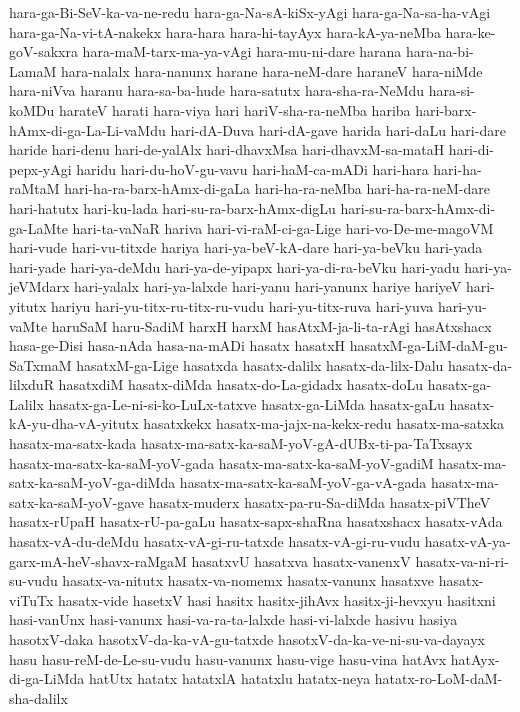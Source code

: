 {hara-ga-Bi-SeV-ka-va-ne-redu
hara-ga-Na-sA-kiSx-yAgi
hara-ga-Na-sa-ha-vAgi
hara-ga-Na-vi-tA-nakekx
hara-hara
hara-hi-tayAyx
hara-kA-ya-neMba
hara-ke-goV-sakxra
hara-maM-tarx-ma-ya-vAgi
hara-mu-ni-dare
harana
hara-na-bi-LamaM
hara-nalalx
hara-nanunx
harane
hara-neM-dare
haraneV
hara-niMde
hara-niVva
haranu
hara-sa-ba-hude
hara-satutx
hara-sha-ra-NeMdu
hara-si-koMDu
harateV
harati
hara-viya
hari
hariV-sha-ra-neMba
hariba
hari-barx-hAmx-di-ga-La-Li-vaMdu
hari-dA-Duva
hari-dA-gave
harida
hari-daLu
hari-dare
haride
hari-denu
hari-de-yalAlx
hari-dhavxMsa
hari-dhavxM-sa-mataH
hari-di-pepx-yAgi
haridu
hari-du-hoV-gu-vavu
hari-haM-ca-mADi
hari-hara
hari-ha-raMtaM
hari-ha-ra-barx-hAmx-di-gaLa
hari-ha-ra-neMba
hari-ha-ra-neM-dare
hari-hatutx
hari-ku-lada
hari-su-ra-barx-hAmx-digLu
hari-su-ra-barx-hAmx-di-ga-LaMte
hari-ta-vaNaR
hariva
hari-vi-raM-ci-ga-Lige
hari-vo-De-me-magoVM
hari-vude
hari-vu-titxde
hariya
hari-ya-beV-kA-dare
hari-ya-beVku
hari-yada
hari-yade
hari-ya-deMdu
hari-ya-de-yipapx
hari-ya-di-ra-beVku
hari-yadu
hari-ya-jeVMdarx
hari-yalalx
hari-ya-lalxde
hari-yanu
hari-yanunx
hariye
hariyeV
hari-yitutx
hariyu
hari-yu-titx-ru-titx-ru-vudu
hari-yu-titx-ruva
hari-yuva
hari-yu-vaMte
haruSaM
haru-SadiM
harxH
harxM
hasAtxM-ja-li-ta-rAgi
hasAtxshacx
hasa-ge-Disi
hasa-nAda
hasa-na-mADi
hasatx
hasatxH
hasatxM-ga-LiM-daM-gu-SaTxmaM
hasatxM-ga-Lige
hasatxda
hasatx-dalilx
hasatx-da-lilx-Dalu
hasatx-da-lilxduR
hasatxdiM
hasatx-diMda
hasatx-do-La-gidadx
hasatx-doLu
hasatx-ga-Lalilx
hasatx-ga-Le-ni-si-ko-LuLx-tatxve
hasatx-ga-LiMda
hasatx-gaLu
hasatx-kA-yu-dha-vA-yitutx
hasatxkekx
hasatx-ma-jajx-na-kekx-redu
hasatx-ma-satxka
hasatx-ma-satx-kada
hasatx-ma-satx-ka-saM-yoV-gA-dUBx-ti-pa-TaTxsayx
hasatx-ma-satx-ka-saM-yoV-gada
hasatx-ma-satx-ka-saM-yoV-gadiM
hasatx-ma-satx-ka-saM-yoV-ga-diMda
hasatx-ma-satx-ka-saM-yoV-ga-vA-gada
hasatx-ma-satx-ka-saM-yoV-gave
hasatx-muderx
hasatx-pa-ru-Sa-diMda
hasatx-piVTheV
hasatx-rUpaH
hasatx-rU-pa-gaLu
hasatx-sapx-shaRna
hasatxshacx
hasatx-vAda
hasatx-vA-du-deMdu
hasatx-vA-gi-ru-tatxde
hasatx-vA-gi-ru-vudu
hasatx-vA-ya-garx-mA-heV-shavx-raMgaM
hasatxvU
hasatxva
hasatx-vanenxV
hasatx-va-ni-ri-su-vudu
hasatx-va-nitutx
hasatx-va-nomemx
hasatx-vanunx
hasatxve
hasatx-viTuTx
hasatx-vide
hasetxV
hasi
hasitx
hasitx-jihAvx
hasitx-ji-hevxyu
hasitxni
hasi-vanUnx
hasi-vanunx
hasi-va-ra-ta-lalxde
hasi-vi-lalxde
hasivu
hasiya
hasotxV-daka
hasotxV-da-ka-vA-gu-tatxde
hasotxV-da-ka-ve-ni-su-va-dayayx
hasu
hasu-reM-de-Le-su-vudu
hasu-vanunx
hasu-vige
hasu-vina
hatAvx
hatAyx-di-ga-LiMda
hatUtx
hatatx
hatatxlA
hatatxlu
hatatx-neya
hatatx-ro-LoM-daM-sha-dalilx
}
